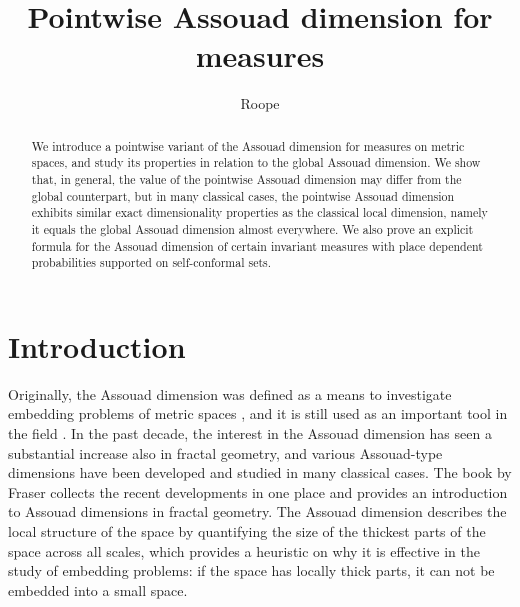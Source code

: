 \documentclass{PRM}
\theoremstyle{plain}
\theoremstyle{definition}
\theoremstyle{remark}
\begin{document}
\title{Pointwise Assouad dimension for measures}

\author{Roope }

\address{Research Unit of Mathematical Sciences\\  P.O.Box 8000, FI-90014, University of Oulu, Finland }

\begin{abstract}
    We introduce a pointwise variant of the Assouad dimension for measures on metric spaces, and study its properties in relation to the global Assouad dimension. We show that, in general, the value of the pointwise Assouad dimension may differ from the global counterpart, but in many classical cases, the pointwise Assouad dimension exhibits similar exact dimensionality properties as the classical local dimension, namely it equals the global Assouad dimension almost everywhere. We also prove an explicit formula for the Assouad dimension of certain invariant measures with place dependent probabilities supported on self-conformal sets.
\end{abstract}




\maketitle

\section{Introduction}
Originally, the Assouad dimension was defined as a means to investigate embedding problems of metric spaces \cite{A}, and it is still used as an important tool in the field \cite{T}. In the past decade, the interest in the Assouad dimension has seen a substantial increase also in fractal geometry, and various Assouad-type dimensions have been developed and studied in many classical cases. The book by Fraser \cite{F} collects the recent developments in one place and provides an introduction to Assouad dimensions in fractal geometry. The Assouad dimension describes the local structure of the space by quantifying the size of the thickest parts of the space across all scales, which provides a heuristic on why it is effective in the study of embedding problems: if the space has locally thick parts, it can not be embedded into a small space.
\end{document}
